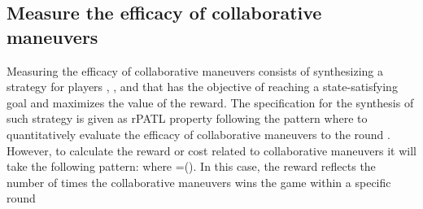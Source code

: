 \subsection{Measure the efficacy of collaborative maneuvers}
Measuring the efficacy of collaborative maneuvers consists of synthesizing a strategy for players , , and  that has the objective of reaching a state-satisfying goal and maximizes the value of the reward. The specification for the synthesis of such strategy is given as rPATL property following the pattern  where \quot{\emath{\textcolor{red}{win}}}\emath{\& \ \textcolor{red}{rounds}<=\textcolor{red}{k})} to quantitatively evaluate the efficacy of collaborative maneuvers to the round . However, to calculate the reward or cost related to collaborative maneuvers it will take the following pattern:  \quot{\textcolor{red}{win}} where  =(\emath{\textcolor{red}{rounds}<=\textcolor{red}{k}}). In this case, the reward reflects the number of times the collaborative maneuvers wins the game within a specific round  